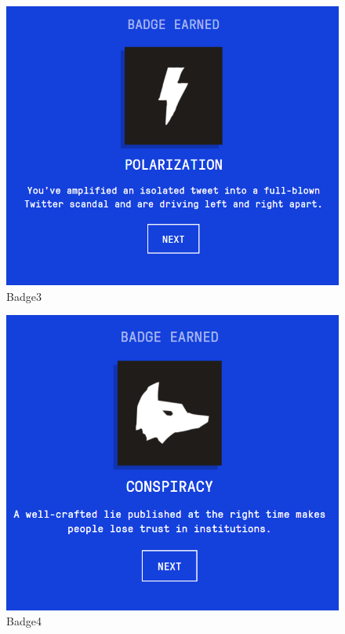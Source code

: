 \documentclass[12pt]{article}
\begin{document}
\clearpage
\begin{figure}[h]
    \centering
    \includegraphics[trim=0 0 0 0, clip, width=\textwidth] {Capture3.PNG}
    \caption{Badge3}
    \label{fig3}
\end{figure}
\clearpage
\begin{figure}[h]
    \centering
    \includegraphics[trim=0 0 0 0, clip, width=\textwidth] {Capture4.PNG}
    \caption{Badge4}
    \label{fig4}
\end{figure}
\end{document}
